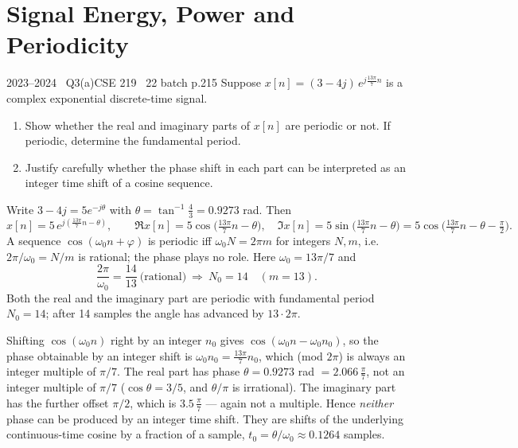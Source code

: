 \renewcommand{\teacherTag}{ANIK SIR \textbullet\ LECTURES 1--2}
\chapter{Signal Energy, Power and Periodicity}

\begin{qcard}{2023--2024 \textbullet\ Q3(a)}{CSE 219 \textbullet\ 22 batch p.2}{15}
Suppose $x[n]=(3-4j)\,e^{j\frac{13\pi}{7}n}$ is a complex exponential discrete-time signal.
\begin{enumerate}[label=(\roman*),leftmargin=2em,itemsep=1pt,topsep=2pt]
\item Show whether the real and imaginary parts of $x[n]$ are periodic or not. If periodic, determine the fundamental period.
\item Justify carefully whether the phase shift in each part can be interpreted as an integer time shift of a cosine sequence.
\end{enumerate}
\end{qcard}
\begin{solution}
Write $3-4j=5e^{-j\theta}$ with $\theta=\tan^{-1}\frac43=0.9273$ rad. Then
\[
x[n]=5\,e^{j(\frac{13\pi}{7}n-\theta)},\qquad
\Re x[n]=5\cos\!\Big(\tfrac{13\pi}{7}n-\theta\Big),\quad
\Im x[n]=5\sin\!\Big(\tfrac{13\pi}{7}n-\theta\Big)=5\cos\!\Big(\tfrac{13\pi}{7}n-\theta-\tfrac\pi2\Big).
\]
 A sequence $\cos(\omega_0n+\varphi)$ is periodic iff $\omega_0N=2\pi m$ for integers $N,m$, i.e.\ $2\pi/\omega_0=N/m$ is rational; the phase plays no role. Here $\omega_0=13\pi/7$ and
\[
\frac{2\pi}{\omega_0}=\frac{14}{13}\ \text{(rational)}\ \Longrightarrow\ N_0=14\quad(m=13).
\]
Both the real and the imaginary part are periodic with fundamental period $N_0=14$; after 14 samples the angle has advanced by $13\cdot2\pi$.

 Shifting $\cos(\omega_0n)$ right by an integer $n_0$ gives $\cos(\omega_0n-\omega_0n_0)$, so the phase obtainable by an integer shift is $\omega_0n_0=\frac{13\pi}{7}n_0$, which (mod $2\pi$) is always an integer multiple of $\pi/7$. The real part has phase $\theta=0.9273$ rad $=2.066\,\frac{\pi}{7}$, not an integer multiple of $\pi/7$ ($\cos\theta=3/5$, and $\theta/\pi$ is irrational). The imaginary part has the further offset $\pi/2$, which is $3.5\,\frac\pi7$ --- again not a multiple. Hence \emph{neither} phase can be produced by an integer time shift. They are shifts of the underlying continuous-time cosine by a fraction of a sample, $t_0=\theta/\omega_0\approx0.1264$ samples.
\end{solution}


